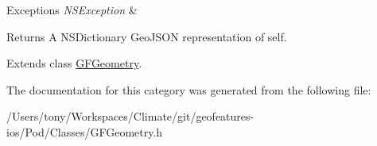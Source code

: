 \begin{DoxyExceptions}{Exceptions}
{\em N\+S\+Exception} & \\
\hline
\end{DoxyExceptions}
\begin{DoxyReturn}{Returns}
A N\+S\+Dictionary Geo\+J\+S\+O\+N representation of self. 
\end{DoxyReturn}


Extends class \hyperlink{interface_g_f_geometry_a89a1dd53c1d9a51fd5b933fde28be5b7}{G\+F\+Geometry}.



The documentation for this category was generated from the following file\+:\begin{DoxyCompactItemize}
\item 
/\+Users/tony/\+Workspaces/\+Climate/git/geofeatures-\/ios/\+Pod/\+Classes/G\+F\+Geometry.\+h\end{DoxyCompactItemize}
